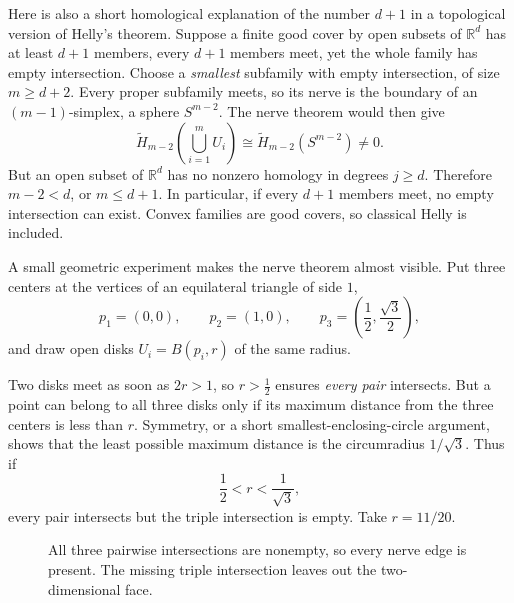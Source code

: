 Here is also a short homological explanation of the number $d+1$ in a topological version of Helly's theorem. Suppose a finite good cover by open subsets of $\mathbb R^d$ has at least $d+1$ members, every $d+1$ members meet, yet the whole family has empty intersection. Choose a \emph{smallest} subfamily with empty intersection, of size $m\ge d+2$. Every proper subfamily meets, so its nerve is the boundary of an $(m-1)$-simplex, a sphere $S^{m-2}$. The nerve theorem would then give
\[
 \widetilde H_{m-2}\!\left(\bigcup_{i=1}^mU_i\right)
 \cong\widetilde H_{m-2}(S^{m-2})\ne0.
\]
But an open subset of $\mathbb R^d$ has no nonzero homology in degrees $j\ge d$. Therefore $m-2<d$, or $m\le d+1$. In particular, if every $d+1$ members meet, no empty intersection can exist. Convex families are good covers, so classical Helly is included.

A small geometric experiment makes the nerve theorem almost visible. Put three centers at the vertices of an equilateral triangle of side $1$,
\[
 p_1=(0,0),\qquad p_2=(1,0),\qquad
 p_3=\left(\frac12,\frac{\sqrt3}{2}\right),
\]
and draw open disks $U_i=B(p_i,r)$ of the same radius.

Two disks meet as soon as $2r>1$, so $r>\frac12$ ensures \emph{every pair} intersects. But a point can belong to all three disks only if its maximum distance from the three centers is less than $r$. Symmetry, or a short smallest-enclosing-circle argument, shows that the least possible maximum distance is the circumradius $1/\sqrt3$. Thus if
\[
 \boxed{\frac12<r<\frac1{\sqrt3},}
\]
every pair intersects but the triple intersection is empty. Take $r=11/20$.

\begin{figure}[H]
\centering
{}
\caption{All three pairwise intersections are nonempty, so every nerve edge is present. The missing triple intersection leaves out the two-dimensional face.}
\end{figure}

